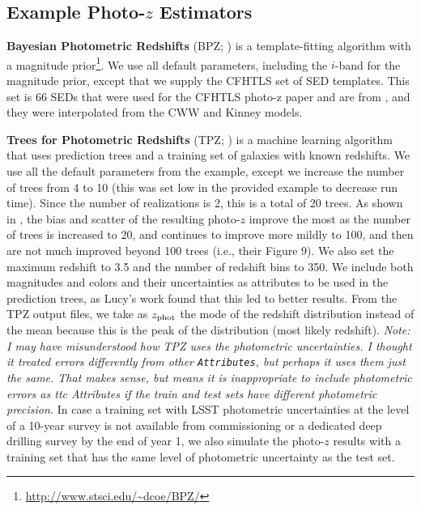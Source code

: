 \documentclass[DM,lsstdraft,toc]{lsstdoc}
\begin{document}
\subsection{Example Photo-$z$ Estimators}\label{ssec:estimators}

{\bf Bayesian Photometric Redshifts} (BPZ; \citealt{2000ApJ...536..571B}) is a template-fitting algorithm with a magnitude prior\footnote{\url{http://www.stsci.edu/~dcoe/BPZ/}}. We use all default parameters, including the $i$-band for the magnitude prior, except that we supply the CFHTLS set of SED templates. This set is 66 SEDs that were used for the CFHTLS photo-z paper and are from \cite{2006A&A...457..841I}, and they were interpolated from the CWW and Kinney models. 

{\bf Trees for Photometric Redshifts} (TPZ; \citealt{2013ascl.soft04011C,2013MNRAS.432.1483C}) is a machine learning algorithm that uses prediction trees and a training set of galaxies with known redshifts. We use all the default parameters from the example, except we increase the number of trees from 4 to 10 (this was set low in the provided example to decrease run time). Since the number of realizations is 2, this is a total of 20 trees. As shown in \cite{2013MNRAS.432.1483C}, the bias and scatter of the resulting photo-$z$ improve the most as the number of trees is increased to 20, and continues to improve more mildly to 100, and then are not much improved beyond 100 trees (i.e., their Figure 9). We also set the maximum redshift to 3.5 and the number of redshift bins to 350. We include both magnitudes and colors and their uncertainties as attributes to be used in the prediction trees, as Lucy's work found that this led to better results. From the TPZ output files, we take as $z_{\rm phot}$ the mode of the redshift distribution instead of the mean because this is the peak of the distribution (most likely redshift). {\it Note: I may have misunderstood how TPZ uses the photometric uncertainties. I thought it treated errors differently from other {\tt Attributes}, but perhaps it uses them just the same. That makes sense, but means it is inappropriate to include photometric errors as {ttc Attributes} if the train and test sets have different photometric precision.} In case a training set with LSST photometric uncertainties at the level of a 10-year survey is not available from commissioning or a dedicated deep drilling survey by the end of year 1, we also simulate the photo-$z$ results with a training set that has the same level of photometric uncertainty as the test set.
\end{document}
